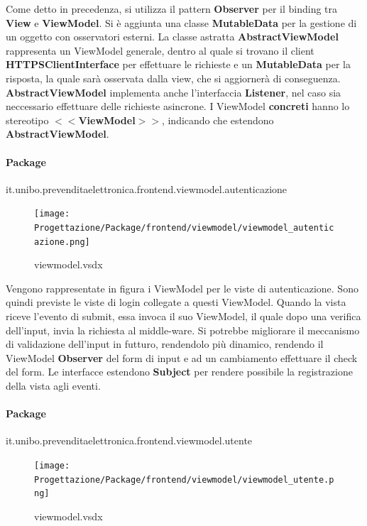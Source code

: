 \documentclass[a4paper]{article}
\begin{document}
Come detto in precedenza, si utilizza il pattern \textbf{Observer} per il binding tra \textbf{View} e \textbf{ViewModel}. Si è aggiunta una classe \textbf{MutableData} per la gestione di un oggetto con osservatori esterni. La classe astratta \textbf{AbstractViewModel} rappresenta un ViewModel generale, dentro al quale si trovano il client \textbf{HTTPSClientInterface} per effettuare le richieste e un \textbf{MutableData} per la risposta, la quale sarà osservata dalla view, che si aggiornerà di conseguenza. \textbf{AbstractViewModel} implementa anche l'interfaccia \textbf{Listener}, nel caso sia neccessario effettuare delle richieste asincrone. I ViewModel \textbf{concreti} hanno lo stereotipo $<<$\textbf{ViewModel}$>>$, indicando che estendono \textbf{AbstractViewModel}.

\newpage

\paragraph{Package} it.unibo.prevenditaelettronica.frontend.viewmodel.autenticazione


\begin{figure}[H]
    \texttt{[image: Progettazione/Package/frontend/viewmodel/viewmodel\_autenticazione.png]}
    \centering
    \caption{viewmodel.vsdx}
\end{figure}

Vengono rappresentate in figura i ViewModel per le viste di autenticazione. Sono quindi previste le viste di login collegate a questi ViewModel. Quando la vista riceve l'evento di submit, essa invoca il suo ViewModel, il quale dopo una verifica dell'input, invia la richiesta al middle-ware. Si potrebbe migliorare il meccanismo di validazione dell'input in futturo, rendendolo più dinamico, rendendo il ViewModel \textbf{Observer} del form di input e ad un cambiamento effettuare il check del form. Le interfacce estendono \textbf{Subject} per rendere possibile la registrazione della vista agli eventi.

\paragraph{Package} it.unibo.prevenditaelettronica.frontend.viewmodel.utente

\begin{figure}[H]
    \texttt{[image: Progettazione/Package/frontend/viewmodel/viewmodel\_utente.png]}
    \centering
    \caption{viewmodel.vsdx}
\end{figure}
\end{document}
